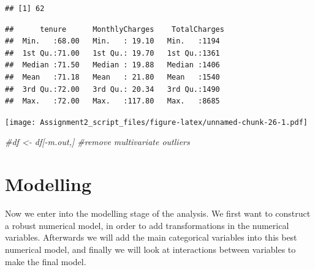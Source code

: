 \documentclass[
]{article}
\newenvironment{Shaded}{\begin{snugshade}}{\end{snugshade}}
\newcommand{\CommentTok}[1]{\textcolor[rgb]{0.56,0.35,0.01}{\textit{#1}}}
\newcommand{\FunctionTok}[1]{\textcolor[rgb]{0.13,0.29,0.53}{\textbf{#1}}}
\newcommand{\NormalTok}[1]{#1}
\newcommand{\OtherTok}[1]{\textcolor[rgb]{0.56,0.35,0.01}{#1}}
\newcommand{\SpecialCharTok}[1]{\textcolor[rgb]{0.81,0.36,0.00}{\textbf{#1}}}
\begin{document}
\begin{verbatim}
## [1] 62
\end{verbatim}

\begin{Shaded}
\end{Shaded}

\begin{verbatim}
##      tenure      MonthlyCharges    TotalCharges 
##  Min.   :68.00   Min.   : 19.10   Min.   :1194  
##  1st Qu.:71.00   1st Qu.: 19.70   1st Qu.:1361  
##  Median :71.50   Median : 19.88   Median :1406  
##  Mean   :71.18   Mean   : 21.80   Mean   :1540  
##  3rd Qu.:72.00   3rd Qu.: 20.34   3rd Qu.:1490  
##  Max.   :72.00   Max.   :117.80   Max.   :8685
\end{verbatim}

\begin{Shaded}
\end{Shaded}

\texttt{[image: Assignment2\_script\_files/figure-latex/unnamed-chunk-26-1.pdf]}

\begin{Shaded}
\begin{Highlighting}[]
\CommentTok{\#df \textless{}{-} df[{-}m.out,] \#remove multivariate outliers}
\end{Highlighting}
\end{Shaded}

\hypertarget{modelling}{%
\section{Modelling}\label{modelling}}

Now we enter into the modelling stage of the analysis. We first want to
construct a robust numerical model, in order to add transformations in
the numerical variables. Afterwards we will add the main categorical
variables into this best numerical model, and finally we will look at
interactions between variables to make the final model.
\end{document}
